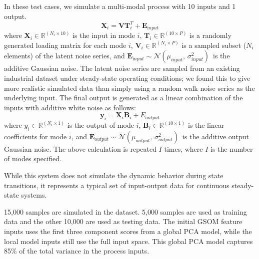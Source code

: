 \documentclass[review,3p]{elsarticle}
\renewcommand\[{\begin{equation}}
\renewcommand\]{\end{equation}}
\begin{document}
In these test cases, we simulate a multi-modal process with 10 inputs and 1 output. 
\[
\mathbf X_i = \mathbf V \mathbf T_i^T + \mathbf E_{\mathrm input}
\]
where $\mathbf X_i \in \mathbb{R}^{(N_i \times 10)}$ is the input in mode $i$, $\mathbf T_i \in \mathbb{R}^{(10 \times P)}$ is a randomly generated loading matrix for each mode $i$, $\mathbf V_i \in \mathbb{R}^(N_i \times P)$ is a sampled subset ($N_i$ elements) of the latent noise series, and $\mathbf E_{\mathrm input} \sim \mathcal{N}(\mu_{input},\,\sigma_{input}^{2})\,$ is the additive Gaussian noise. The latent noise series are sampled from an existing industrial dataset under steady-state operating conditions; we found this to give more realistic simulated data than simply using a random walk noise series as the underlying input. The final output is generated as a linear combination of the inputs with additive white noise as follows: 
\[
\mathbf y_i = \mathbf X_i \mathbf B_i + E_{\mathrm output}
\]
where $y_i \in \mathbb{R}^{(N_i \times 1)}$ is the output of mode $i$, $\mathbf B_i \in \mathbb{R}^{(10 \times 1)}$ is the linear coefficients for mode $i$, and $\mathbf E_{\mathrm output} \sim \mathcal{N}(\mu_{output},\,\sigma_{output}^{2})\,$ is the additive output Gaussian noise.
The above calculation is repeated $I$ times, where $I$ is the number of modes specified. 

While this system does not simulate the dynamic behavior during state transitions, it represents a typical set of input-output data for continuous steady-state systems.

15,000 samples are simulated in the dataset. 5,000 samples are used as
training data and the other 10,000 are used as testing data.
The initial GSOM feature inputs uses the first three component scores from a global PCA model, while the local model inputs still use the full input space. 
This global PCA model captures 85\% of the total variance in the process inputs.
\end{document}
